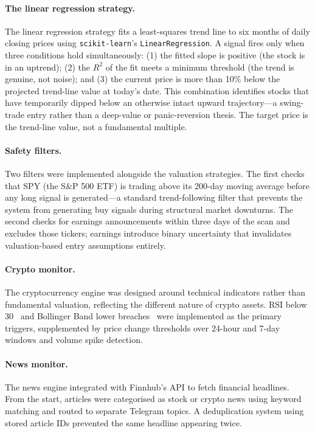 \documentclass[12pt,a4paper]{article}
\begin{document}
\paragraph{The linear regression strategy.} The linear regression strategy fits a least-squares trend line to six months of daily closing prices using \texttt{scikit-learn}'s \texttt{LinearRegression}. A signal fires only when three conditions hold simultaneously: (1) the fitted slope is positive (the stock is in an uptrend); (2) the $R^2$ of the fit meets a minimum threshold (the trend is genuine, not noise); and (3) the current price is more than 10\% below the projected trend-line value at today's date. This combination identifies stocks that have temporarily dipped below an otherwise intact upward trajectory---a swing-trade entry rather than a deep-value or panic-reversion thesis. The target price is the trend-line value, not a fundamental multiple.


\paragraph{Safety filters.} Two filters were implemented alongside the valuation strategies. The first checks that SPY (the S\&P 500 ETF) is trading above its 200-day moving average before any long signal is generated---a standard trend-following filter that prevents the system from generating buy signals during structural market downturns. The second checks for earnings announcements within three days of the scan and excludes those tickers; earnings introduce binary uncertainty that invalidates valuation-based entry assumptions entirely.

\paragraph{Crypto monitor.} The cryptocurrency engine was designed around technical indicators rather than fundamental valuation, reflecting the different nature of crypto assets. RSI below 30~\cite{wilder1978} and Bollinger Band lower breaches~\cite{bollinger2002} were implemented as the primary triggers, supplemented by price change thresholds over 24-hour and 7-day windows and volume spike detection.

\paragraph{News monitor.} The news engine integrated with Finnhub's API to fetch financial headlines. From the start, articles were categorised as stock or crypto news using keyword matching and routed to separate Telegram topics. A deduplication system using stored article IDs prevented the same headline appearing twice.
\end{document}
